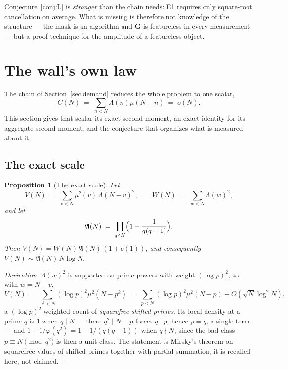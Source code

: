 \documentclass[11pt,a4paper]{article}
\theoremstyle{plain}
\newtheorem{proposition}[theorem]{Proposition}
\theoremstyle{definition}
\newcommand{\AAA}{\mathfrak{A}}
\begin{document}
Conjecture~\ref{conj:L} is \emph{stronger} than the chain needs: E1
requires only square-root cancellation on average. What is missing is
therefore not knowledge of the structure --- the mask is an algorithm
and $\mathbf G$ is featureless in every measurement --- but a proof
technique for the amplitude of a featureless object.

\section{The wall's own law}\label{sec:wall}

The chain of Section~\ref{sec:demand} reduces the whole problem to one
scalar,
\[
  C(N) \;=\; \sum_{n<N}\Lambda(n)\mu(N-n) \;=\; o(N).
\]
This section gives that scalar its exact second moment, an exact
identity for its aggregate second moment, and the conjecture that
organizes what is measured about it.

\subsection{The exact scale}

\begin{proposition}[The exact scale]\label{prop:V}
Let
\[
  V(N) \;=\; \sum_{v<N}\mu^2(v)\,\Lambda(N-v)^2,
  \qquad
  W(N) \;=\; \sum_{w<N}\Lambda(w)^2,
\]
and let
\[
  \AAA(N) \;=\; \prod_{q\,\nmid\,N}\Bigl(1-\frac{1}{q(q-1)}\Bigr).
\]
Then $V(N) = W(N)\,\AAA(N)\,(1+o(1))$, and consequently
$V(N) \sim \AAA(N)\,N\log N$.
\end{proposition}

\begin{proof}[Derivation]
$\Lambda(w)^2$ is supported on prime powers with weight $(\log p)^2$,
so with $w=N-v$,
\[
  V(N) \;=\; \sum_{p^k<N}(\log p)^2\mu^2(N-p^k)
        \;=\; \sum_{p<N}(\log p)^2\mu^2(N-p) + O(\sqrt N\log^2 N),
\]
a $(\log p)^2$-weighted count of \emph{squarefree shifted primes}. Its
local density at a prime $q$ is $1$ when $q\mid N$ --- there
$q^2\mid N-p$ forces $q\mid p$, hence $p=q$, a single term --- and
$1-1/\varphi(q^2) = 1-1/(q(q-1))$ when $q\nmid N$, since the bad class
$p\equiv N \pmod{q^2}$ is then a unit class. The statement is Mirsky's
theorem on squarefree values of shifted primes \cite{Mir49} together
with partial summation; it is recalled here, not claimed.
\end{proof}
\end{document}
